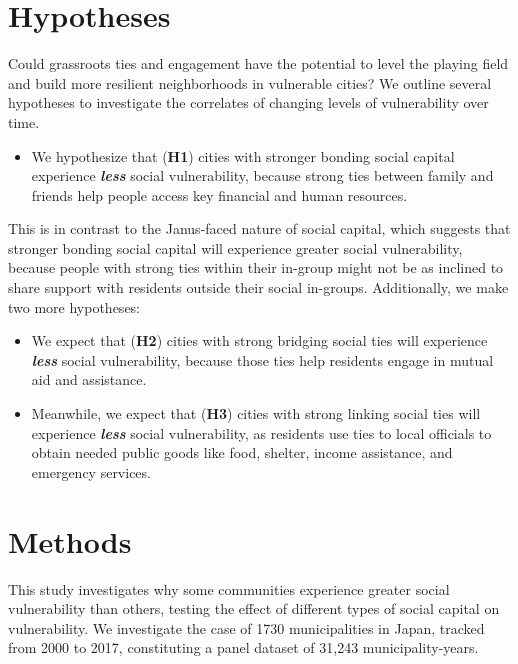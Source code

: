 \documentclass[]{elsarticle} %
\providecommand{\tightlist}{%
  \setlength{\itemsep}{0pt}\setlength{\parskip}{0pt}}
\begin{document}
\hypertarget{hypotheses}{%
\section{Hypotheses}\label{hypotheses}}

Could grassroots ties and engagement have the potential to level the
playing field and build more resilient neighborhoods in vulnerable
cities? We outline several hypotheses to investigate the correlates of
changing levels of vulnerability over time.

\begin{itemize}
\tightlist
\item
  We hypothesize that (\textbf{H1}) cities with stronger bonding social
  capital experience \textbf{\emph{less}} social vulnerability, because
  strong ties between family and friends help people access key
  financial and human resources.
\end{itemize}

This is in contrast to the Janus-faced nature of social capital, which
suggests that stronger bonding social capital will experience greater
social vulnerability, because people with strong ties within their
in-group might not be as inclined to share support with residents
outside their social in-groups. Additionally, we make two more
hypotheses:

\begin{itemize}
\item
  We expect that (\textbf{H2}) cities with strong bridging social ties
  will experience \textbf{\emph{less}} social vulnerability, because
  those ties help residents engage in mutual aid and assistance.
\item
  Meanwhile, we expect that (\textbf{H3}) cities with strong linking
  social ties will experience \textbf{\emph{less}} social vulnerability,
  as residents use ties to local officials to obtain needed public goods
  like food, shelter, income assistance, and emergency services.
\end{itemize}

\hypertarget{methods}{%
\section{Methods}\label{methods}}

This study investigates why some communities experience greater social
vulnerability than others, testing the effect of different types of
social capital on vulnerability. We investigate the case of 1730
municipalities in Japan, tracked from 2000 to 2017, constituting a panel
dataset of 31,243 municipality-years.
\end{document}
